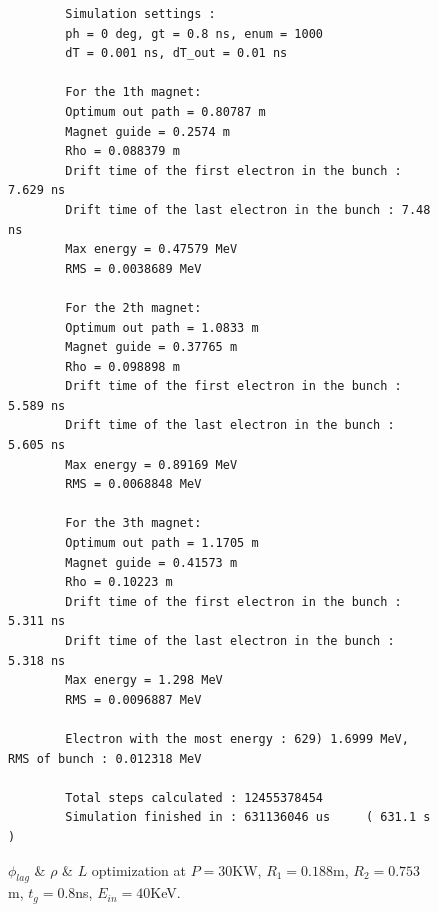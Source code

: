 \documentclass[a4paper,oneside,12pt]{report}
\numberwithin{equation}{chapter}
\begin{document}
{\begin{figure}[H]
\begin{verbatim}
        Simulation settings : 
        ph = 0 deg, gt = 0.8 ns, enum = 1000
        dT = 0.001 ns, dT_out = 0.01 ns
        
        For the 1th magnet:
        Optimum out path = 0.80787 m
        Magnet guide = 0.2574 m
        Rho = 0.088379 m
        Drift time of the first electron in the bunch : 7.629 ns
        Drift time of the last electron in the bunch : 7.48 ns
        Max energy = 0.47579 MeV
        RMS = 0.0038689 MeV
        
        For the 2th magnet:
        Optimum out path = 1.0833 m
        Magnet guide = 0.37765 m
        Rho = 0.098898 m
        Drift time of the first electron in the bunch : 5.589 ns
        Drift time of the last electron in the bunch : 5.605 ns
        Max energy = 0.89169 MeV
        RMS = 0.0068848 MeV
        
        For the 3th magnet:
        Optimum out path = 1.1705 m
        Magnet guide = 0.41573 m
        Rho = 0.10223 m
        Drift time of the first electron in the bunch : 5.311 ns
        Drift time of the last electron in the bunch : 5.318 ns
        Max energy = 1.298 MeV
        RMS = 0.0096887 MeV
        
        Electron with the most energy : 629) 1.6999 MeV,	RMS of bunch : 0.012318 MeV
        
        Total steps calculated : 12455378454
        Simulation finished in : 631136046 us     ( 631.1 s )        
    \end{verbatim}
    \vspace{20pt}
\caption{$\phi_{lag}$ \& $\rho$ \& $L$ optimization at $P=30$KW, $R_1=0.188$m, $R_2=0.753$m, $t_g=0.8$ns, $E_{in}=40$KeV.}
\label{fig:lout_opt_08ns_Erms}
\end{figure}

}
\end{document}
